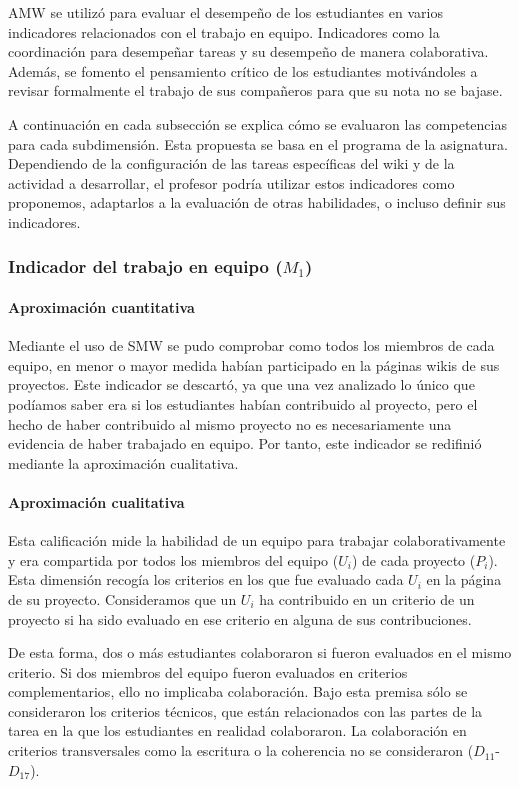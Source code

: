 AMW se utilizó para evaluar el desempeño de los estudiantes en varios indicadores relacionados con el trabajo en equipo. Indicadores como la coordinación para desempeñar tareas y su desempeño de manera colaborativa. Además, se fomento el pensamiento crítico de los estudiantes motivándoles a revisar formalmente el trabajo de sus compañeros para que su nota no se bajase.

A continuación en cada subsección se explica cómo se evaluaron las competencias para cada subdimensión. Esta propuesta se basa en el programa de la asignatura. Dependiendo de la configuración de las tareas específicas del wiki y de la actividad a desarrollar, el profesor podría utilizar estos indicadores como proponemos, adaptarlos a la evaluación de otras habilidades, o incluso definir sus indicadores.

\subsubsection{Indicador del trabajo en equipo ($M_1$)}

\paragraph*{Aproximación cuantitativa}

Mediante el uso de SMW se pudo comprobar como todos los miembros de cada equipo, en menor o mayor medida habían participado en la páginas wikis de sus proyectos. Este indicador se descartó, ya que una vez analizado lo único que podíamos saber era si los estudiantes habían contribuido al proyecto, pero el hecho de haber contribuido al mismo proyecto no es necesariamente una evidencia de haber trabajado en equipo. Por tanto, este indicador se redifinió mediante la aproximación cualitativa.

\paragraph*{Aproximación cualitativa}

Esta calificación mide la habilidad de un equipo para trabajar colaborativamente y era compartida por todos los miembros del equipo ($U_i$) de cada proyecto ($P_i$). Esta dimensión recogía los criterios en los que fue evaluado cada $U_i$ en la página de su proyecto. Consideramos que un $U_i$ ha contribuido en un criterio de un proyecto si ha sido evaluado en ese criterio en alguna de sus contribuciones.

De esta forma, dos o más estudiantes colaboraron si fueron evaluados en el mismo criterio. Si dos miembros del equipo fueron evaluados en criterios complementarios, ello no implicaba colaboración. Bajo esta premisa sólo se consideraron los criterios técnicos, que están relacionados con las partes de la tarea en la que los estudiantes en realidad colaboraron. La colaboración en criterios transversales como la escritura o la coherencia no se consideraron ($D_{11}$-$D_{17}$).

